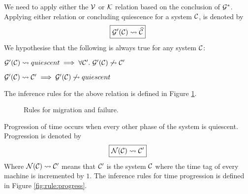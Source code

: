 \clearpage
We need to apply either the $\mathcal{V}$ or $\mathcal{K}$ relation based on the conclusion of
$\mathcal{G}^*$. Applying either relation or concluding quiescence for a system $\mathcal{C}$, is
denoted by
\begin{equation*}
\boxed{\mathcal{G}'(\mathcal{C}) \leadsto \widehat{\mathcal{C}}}
\end{equation*}
We hypothesise that the following is always true for any system $\mathcal{C}$:
\begin{theorem}
$\mathcal{G}'(\mathcal{C}) \leadsto quiescent \implies \forall \mathcal{C}'.~ \mathcal{G}'(\mathcal{C}) \not\leadsto \mathcal{C}'$
\end{theorem}
\begin{theorem}
$\mathcal{G}'(\mathcal{C}) \leadsto \mathcal{C}' \implies \mathcal{G}'(\mathcal{C}) \not\leadsto quiescent$
\end{theorem}
The inference rules for the above relation is defined in Figure
\ref{fig:rule:mighalt}.

\begin{figure}[!ht]
\caption{Rules for migration and failure.}\label{fig:rule:mighalt}
\end{figure}

Progression of time occurs when every other phase of the system is quiescent.
Progression is denoted by
\begin{equation*}
\boxed{\mathcal{N}(\mathcal{C}) \leadsto \mathcal{C}'}
\end{equation*}
Where $\mathcal{N}(\mathcal{C}) \leadsto \mathcal{C}'$ means that $\mathcal{C}'$ is the system $\mathcal{C}$ where the time
tag of every machine is incremented by $1$. The inference rules for time
progression is defined in Figure \ref{fig:rule:progress}.



